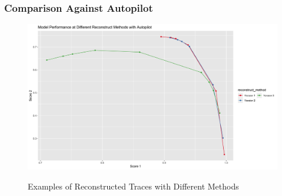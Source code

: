\documentclass{article}
\begin{document}
\subsubsection{Comparison Against Autopilot}

\begin{figure}
    \caption{Examples of Reconstructed Traces with Different Methods}
    \centering
    \includegraphics{images/ModelPerformanceatDifferentReconstructMethodswithAutopilot.png}
    \label{fig:fig1.11.1}
\end{figure}
\end{document}
